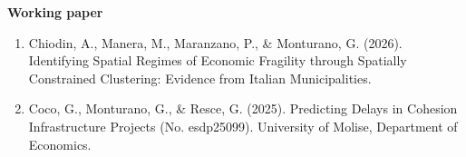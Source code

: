 \documentclass[11pt,a4paper,sans]{moderncv} %
\begin{document}

    
    








\textbf{Working paper}


\begin{enumerate}[label=\arabic*.] 

\item  Chiodin, A., Manera, M., Maranzano, P., \& Monturano, G. (2026). Identifying Spatial Regimes of Economic Fragility through Spatially Constrained Clustering: Evidence from Italian Municipalities.


\item  Coco, G., Monturano, G., \& Resce, G. (2025). Predicting Delays in Cohesion Infrastructure Projects (No. esdp25099). University of Molise, Department of Economics.
\end{enumerate}
\end{document}
